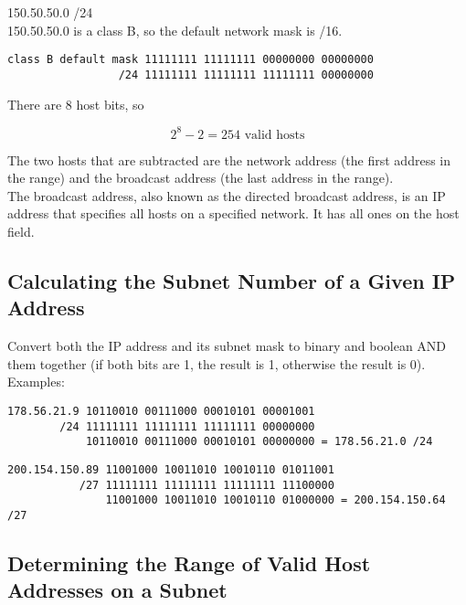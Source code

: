 150.50.50.0 /24\\

150.50.50.0 is a class B, so the default network mask is /16.

\begin{verbatim}
class B default mask 11111111 11111111 00000000 00000000
                 /24 11111111 11111111 11111111 00000000
\end{verbatim}

There are 8 host bits, so

\begin{equation}
2 ^ 8 - 2 = 254 \mbox{ valid hosts}
\end{equation}

The two hosts that are subtracted are the network address (the first address in
the range) and the broadcast address (the last address in the range).\\

The broadcast address, also known as the directed broadcast address, is an IP
address that specifies all hosts on a specified network. It has all ones on the
host field.

\subsection{Calculating the Subnet Number of a Given IP Address}

Convert both the IP address and its subnet mask to binary and boolean AND
them together (if both bits are 1, the result is 1, otherwise the result is
0).\\

Examples:

\begin{verbatim}
178.56.21.9 10110010 00111000 00010101 00001001
        /24 11111111 11111111 11111111 00000000
            10110010 00111000 00010101 00000000 = 178.56.21.0 /24
\end{verbatim}

\begin{verbatim}
200.154.150.89 11001000 10011010 10010110 01011001
           /27 11111111 11111111 11111111 11100000
               11001000 10011010 10010110 01000000 = 200.154.150.64 /27
\end{verbatim}

\subsection{Determining the Range of Valid Host Addresses on a Subnet}

